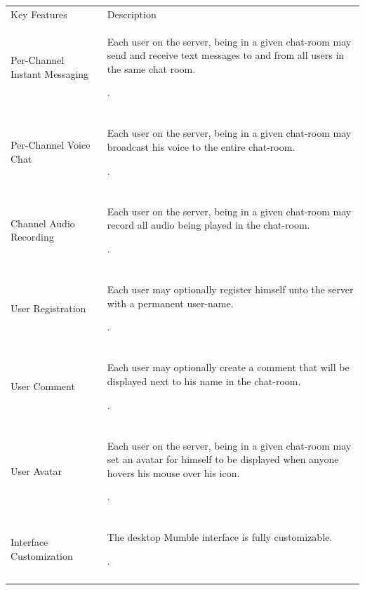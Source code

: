 \documentclass[twoside, titlepage]{article}
\begin{document}
	\newpage
	\begin{tabular}[t]{ll}\toprule
		\rowcolor{yellow-green}
		Key Features & Description \\
		\rowcolor{gray}
		Per-Channel Instant Messaging & \begin{minipage}{0.5\textwidth}
			Each user on the server, being in a given
			chat-room may send and receive text messages
			to and from all users in the same chat room.
		\end{minipage}. \\\\
		Per-Channel Voice Chat & \begin{minipage}{0.5\textwidth}
			Each user on the server, being in a given
			chat-room may broadcast his voice to the entire
			chat-room.
		\end{minipage}. \\\\
		\rowcolor{gray}
		Channel Audio Recording & \begin{minipage}{0.5\textwidth}
			Each user on the server, being in a given
			chat-room may record all audio being played
			in the chat-room.
		\end{minipage}. \\\\
		User Registration & \begin{minipage}{0.5\textwidth}
			Each user may optionally register himself
			unto the server with a permanent user-name.
		\end{minipage}. \\\\
		\rowcolor{gray}
		User Comment & \begin{minipage}{0.5\textwidth}
			Each user may optionally create a comment
			that will be displayed next to his name in the 
			chat-room.
		\end{minipage}. \\\\
		User Avatar & \begin{minipage}{0.5\textwidth}
			Each user on the server, being in a given
			chat-room may set an avatar for himself to be
			displayed when anyone hovers his mouse over his
			icon.
		\end{minipage}. \\\\
		\rowcolor{gray}
		Interface Customization & \begin{minipage}{0.7\textwidth}
			The desktop Mumble interface is fully customizable.
		\end{minipage}. \\\\

\end{tabular}
\end{document}

